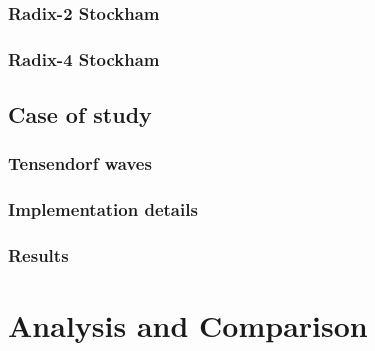 \documentclass[
  oneside,
  11pt, a4paper,
  footinclude=true,
  headinclude=true,
  cleardoublepage=empty
]{scrbook}
\begin{document}
\subsection{Radix-2 Stockham}

\subsection{Radix-4 Stockham}





\section{Case of study}
\subsection{Tensendorf waves}


\subsection{Implementation details}
\subsection{Results}

\chapter{Analysis and Comparison}
\end{document}
